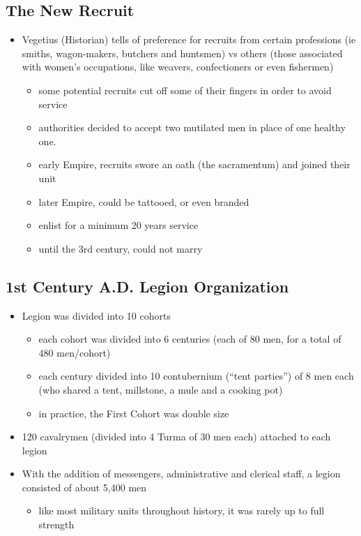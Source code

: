 \documentclass[12pt, twoside]{article}
\begin{document}
\subsection{The New Recruit}
\begin{itemize}
\item Vegetius (Historian) tells of preference for recruits from certain professions (ie smiths, wagon-makers, butchers and huntsmen) vs others (those associated with women's occupations, like weavers, confectioners or even fishermen) 
	\begin{itemize}
	\item some potential recruits cut off some of their fingers in order to avoid service
	\item authorities decided to accept two mutilated men in place of one healthy one.
	\item early Empire, recruits swore an oath (the sacramentum)
 	and joined their unit
	\item later Empire, could be tattooed, or even branded 
	\item enlist for a minimum 20 years service
	\item until the 3rd century, could not marry
	\end{itemize}
\end{itemize}

\subsection{1st Century A.D. Legion Organization}
\begin{itemize}
\item Legion was divided into 10 cohorts 
	\begin{itemize}
	\item each cohort was divided into 6 centuries (each of 80 men, for a total of 480 men/cohort)
	\item each century divided into 10 contubernium (“tent parties”) of 8 men each (who shared a tent, millstone, a mule and a cooking pot)
	\item in practice, the First Cohort was double size
	\end{itemize}
\item 120 cavalrymen (divided into 4 Turma of 30 men each) attached to each legion 
\item With the addition of messengers, administrative and clerical staff, a legion consisted of about 5,400 men
	\begin{itemize}
	\item like most military units throughout history, it was rarely up to full strength
	\end{itemize}
\end{itemize}
\end{document}
